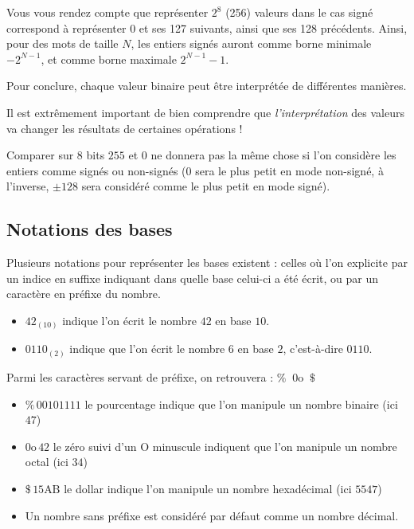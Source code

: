 \documentclass[11pt,a4paper]{article}
\begin{document}
\bigskip

Vous vous rendez compte que représenter $ 2^8 $ (256) valeurs dans le cas signé correspond à représenter $ 0 $ et ses 127 suivants, ainsi que ses 128 précédents.
Ainsi, pour des mots de taille $ N $, les entiers signés auront comme borne minimale $ - 2^{N-1} $, et comme borne maximale $ 2^{N-1} - 1 $.

Pour conclure, chaque valeur binaire peut être interprétée de différentes manières.

Il est extrêmement important de bien comprendre que \textit{l'interprétation} des valeurs va changer les résultats de certaines opérations !

Comparer sur 8 bits $ 255 $ et $ 0 $ ne donnera pas la même chose si l'on considère les entiers comme signés ou non-signés ($ 0 $ sera le plus petit en mode non-signé, à l'inverse, $ \pm 128 $ sera considéré comme le plus petit en mode signé).

\medskip


\subsection{Notations des bases}

\medskip

Plusieurs notations pour représenter les bases existent : celles où l'on explicite par un indice en suffixe indiquant dans quelle base celui-ci a été écrit, ou par un caractère en préfixe du nombre.

\begin{itemize}
\item $ 42_{(10)} $ indique l'on écrit le nombre \og $ 42 $ \fg{} en base $ 10 $.
\item $ 0110_{(2)} $ indique que l'on écrit le nombre \og $ 6 $ \fg{} en base $ 2 $, c'est-à-dire $ 0110 $.
\end{itemize}

\medskip

Parmi les caractères servant de préfixe, on retrouvera : $ \%   \; \;  0\text{o}  \; \;  \$  $

\begin{itemize}
\item \og $ \% \, 00101111 $ \fg{} le pourcentage indique que l'on manipule un nombre binaire (ici $ 47 $)
\item \og $ 0\text{o} \, 42 $ \fg{} le zéro suivi d'un O minuscule indiquent que l'on manipule un nombre octal (ici $ 34 $)
\item \og $ \$ \, 15\text{AB} $ \fg{} le dollar indique l'on manipule un nombre hexadécimal (ici $ 5547 $)
\item Un nombre sans préfixe est considéré par défaut comme un nombre décimal.
\end{itemize}
\end{document}

